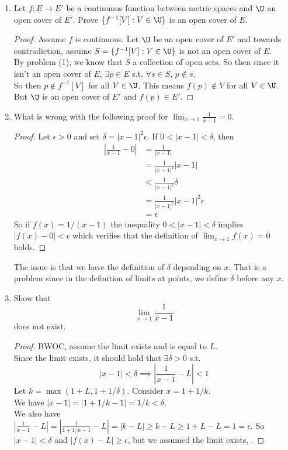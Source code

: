 \documentclass[14pt]{extarticle}
\begin{document}
\begin{enumerate}
		\item Let $f : E \rightarrow E'$ be a continuous function between metric spaces and $\U$ an open cover of $E'$. Prove $\{f^{-1}[V] : V \in \U\}$ is an open cover of $E$.
		\begin{proof}
			Assume $f$ is continuous. Let $\U$ be an open cover of $E'$ and towards contradiction, assume $S = \{f^{-1}[V] : V \in \U\}$ is not an open cover of $E$.\\
			By problem (1), we know that $S$ a collection of open sets. So then since it isn't an open cover of $E$, $\exists p \in E$ s.t. $\forall s\in S$, $p \nin s$.\\
			So then $p \nin f^{-1}[V]$ for all $V\in\U$. This means $f(p)\nin V$ for all $V\in\U$.\\
			But $\U$ is an open cover of $E'$ and $f(p)\in E'$. \contra
		\end{proof}
		
		\item What is wrong with the following proof for $\lim_{x\rightarrow1}\frac{1}{x-1} = 0$.
		\begin{proof}
			Let $\epsilon>0$ and set $\delta = |x-1|^2\epsilon$. If $0<|x-1|<\delta$, then
			\begin{align*}
				|\frac{1}{x-1}-0| & = \frac{1}{|x-1|}\\
				&=\frac{1}{|x-1|^2}|x-1|\\
				&<\frac{1}{|x-1|^2}\delta\\
				&=\frac{1}{|x-1|^2}|x-1|^2\epsilon\\
				&=\epsilon
			\end{align*}
			So if $f(x) = 1/(x - 1)$ the inequality $0 < |x - 1| < \delta$ implies $|f(x) - 0| < \epsilon$ which verifies that the definition of $\lim_{x\rightarrow1}f(x) = 0$ holds.
		\end{proof}
		The issue is that we have the definition of $\delta$ depending on $x$. That is a problem since in the definition of limits at points, we define $\delta$ before any $x$.
		
		\item Show that \[\lim_{x\rightarrow1}\frac{1}{x-1}\] does not exist.
		\begin{proof}
			BWOC, assume the limit exists and is equal to $L$.\\
			Since the limit exists, it should hold that $\exists\delta>0$ s.t.
			\[|x-1|<\delta \implies \left|\frac{1}{x-1}-L\right|<1\]
			Let $k = \max(1+L,1+1/\delta)$. Consider $x = 1+1/k$.\\
			We have $|x-1| = |1+1/k-1| = 1/k < \delta$.\\
			We also have $|\frac{1}{x-1}-L| = |\frac{1}{1+1/k-1}-L| = |k-L| \geq k-L \geq 1+L-L = 1 = \epsilon$.
			So $|x-1|<\delta$ and $|f(x)-L|\geq\epsilon$, but we assumed the limit exists, \contra.
		\end{proof}
		
	\end{enumerate}
\end{document}
